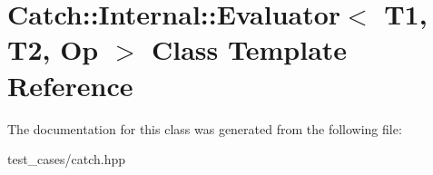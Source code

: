 \hypertarget{classCatch_1_1Internal_1_1Evaluator}{}\section{Catch\+:\+:Internal\+:\+:Evaluator$<$ T1, T2, Op $>$ Class Template Reference}
\label{classCatch_1_1Internal_1_1Evaluator}


The documentation for this class was generated from the following file\+:\begin{DoxyCompactItemize}
\item 
test\+\_\+cases/catch.\+hpp\end{DoxyCompactItemize}
